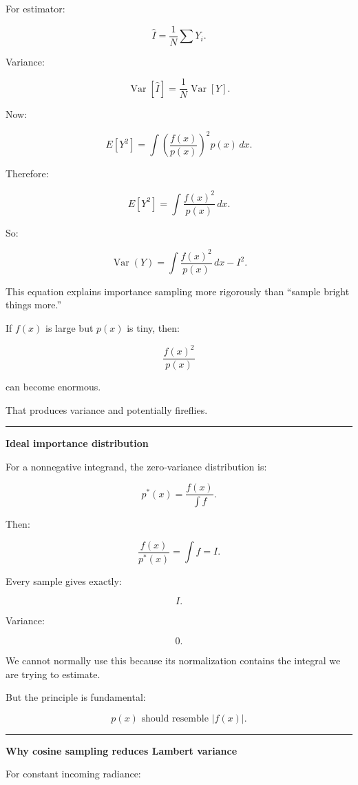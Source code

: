 For estimator:

\[
\hat I=\frac1N\sum Y_i.
\]

Variance:

\[
\operatorname{Var}[\hat I]
=
\frac{1}{N}
\operatorname{Var}[Y].
\]

Now:

\[
E[Y^2]
=
\int
\left(
\frac{f(x)}{p(x)}
\right)^2
p(x)\,dx.
\]

Therefore:

\[
E[Y^2]
=
\boxed{
\int
\frac{f(x)^2}{p(x)}
\,dx.
}
\]

So:

\[
\boxed{
\operatorname{Var}(Y)
=
\int
\frac{f(x)^2}{p(x)}
\,dx
-
I^2.
}
\]

This equation explains importance sampling more rigorously than ``sample bright things more.''

If \(f(x)\) is large but \(p(x)\) is tiny, then:

\[
\frac{f(x)^2}{p(x)}
\]

can become enormous.

That produces variance and potentially fireflies.

\begin{center}\rule{0.5\linewidth}{0.5pt}\end{center}

\textbf{Ideal importance distribution}

For a nonnegative integrand, the zero-variance distribution is:

\[
\boxed{
p^*(x)
=
\frac{
f(x)
}{
\int f
}.
}
\]

Then:

\[
\frac{f(x)}{p^*(x)}
=
\int f
=
I.
\]

Every sample gives exactly:

\[
I.
\]

Variance:

\[
0.
\]

We cannot normally use this because its normalization contains the integral we are trying to estimate.

But the principle is fundamental:

\[
\boxed{
p(x)\text{ should resemble }|f(x)|.
}
\]

\begin{center}\rule{0.5\linewidth}{0.5pt}\end{center}

\textbf{Why cosine sampling reduces Lambert variance}

For constant incoming radiance:

